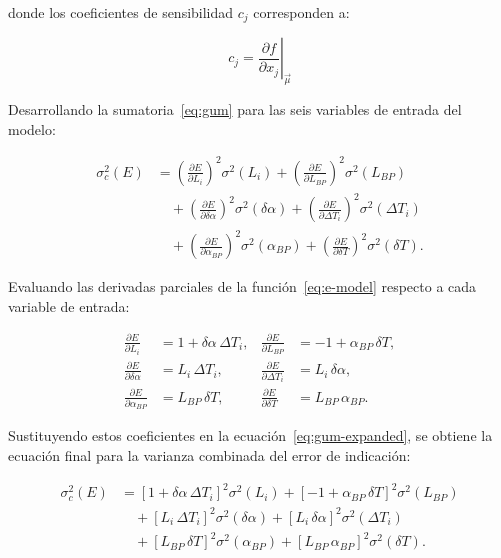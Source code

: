 donde los coeficientes de sensibilidad $c_j$ corresponden a:

\begin{equation}
  c_j = \left. \frac{\partial f}{\partial x_j} \right|_{\vec{\mu}}
  \label{eq:sens-coef}
\end{equation}

Desarrollando la sumatoria~\eqref{eq:gum} para las seis variables de entrada del modelo:

\begin{align}
  \sigma_c^2(E) &=
  \left( \frac{\partial E}{\partial L_i} \right)^2 \sigma^2(L_i) +
  \left( \frac{\partial E}{\partial L_{BP}} \right)^2 \sigma^2(L_{BP}) \nonumber \\
  &\quad + \left( \frac{\partial E}{\partial \delta\alpha} \right)^2 \sigma^2(\delta\alpha) +
  \left( \frac{\partial E}{\partial \Delta T_i} \right)^2 \sigma^2(\Delta T_i) \label{eq:gum-expanded} \\
  &\quad + \left( \frac{\partial E}{\partial \alpha_{BP}} \right)^2 \sigma^2(\alpha_{BP}) +
  \left( \frac{\partial E}{\partial \delta T} \right)^2 \sigma^2(\delta T). \nonumber
\end{align}

Evaluando las derivadas parciales de la función~\eqref{eq:e-model} respecto a cada variable de entrada:

\begin{align}
  \frac{\partial E}{\partial L_i} &= 1 + \delta\alpha \, \Delta T_i, &
  \frac{\partial E}{\partial L_{BP}} &= -1 + \alpha_{BP} \, \delta T, \nonumber \\
  \frac{\partial E}{\partial \delta\alpha} &= L_i \, \Delta T_i, &
  \frac{\partial E}{\partial \Delta T_i} &= L_i \, \delta\alpha, \label{eq:sens-deriv} \\
  \frac{\partial E}{\partial \alpha_{BP}} &= L_{BP} \, \delta T, &
  \frac{\partial E}{\partial \delta T} &= L_{BP} \, \alpha_{BP}. \nonumber
\end{align}

Sustituyendo estos coeficientes en la ecuación~\eqref{eq:gum-expanded}, se obtiene la ecuación final para la varianza combinada del error de indicación:

\begin{align}
  \sigma_c^2(E) &=
  [1 + \delta\alpha \, \Delta T_i]^2 \sigma^2(L_i) +
  [-1 + \alpha_{BP} \, \delta T]^2 \sigma^2(L_{BP}) \nonumber \\
  &\quad + [L_i \, \Delta T_i]^2 \sigma^2(\delta\alpha) +
  [L_i \, \delta\alpha]^2 \sigma^2(\Delta T_i) \label{eq:sigma-final} \\
  &\quad + [L_{BP} \, \delta T]^2 \sigma^2(\alpha_{BP}) +
  [L_{BP} \, \alpha_{BP}]^2 \sigma^2(\delta T). \nonumber
\end{align}

